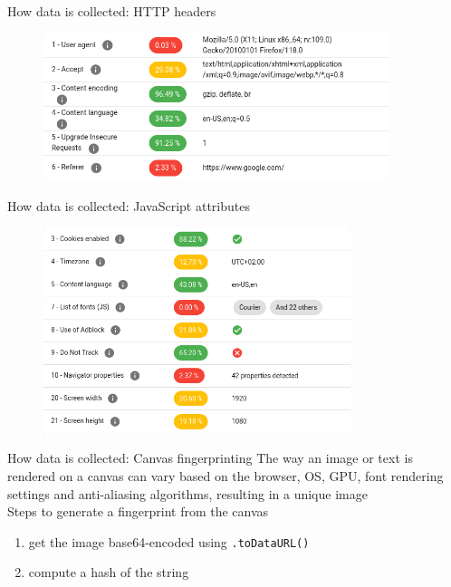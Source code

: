 \begin{frame}{How data is collected: HTTP headers}
  \begin{figure}
    \centering
    \includegraphics[width=0.9\textwidth]{images/http-data.png}
  \end{figure}
\end{frame}

\begin{frame}{How data is collected: JavaScript attributes}
  \begin{figure}
    \centering
    \includegraphics[width=0.8\textwidth]{images/js-data.png}
  \end{figure}
\end{frame}

\begin{frame}{How data is collected: Canvas fingerprinting}
  The way an image or text is rendered on a canvas can vary based on the browser, OS, GPU, font rendering settings and anti-aliasing algorithms, resulting in a unique image \\[1cm]
  \noindent Steps to generate a fingerprint from the canvas
  \vspace{0.5cm}
  \begin{enumerate}
    \item get the image base64-encoded using \texttt{.toDataURL()}
          \vspace{0.5cm}
    \item compute a hash of the string
  \end{enumerate}
\end{frame}

